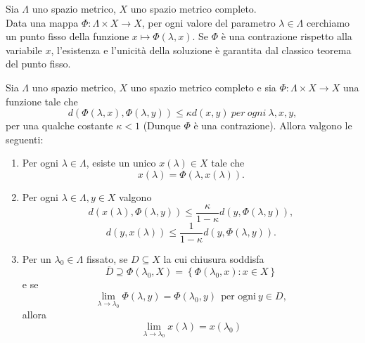 Sia $\Lambda$ uno spazio metrico, $X$ uno spazio metrico completo. \\ Data una mappa $\Phi : \Lambda \times X \rightarrow X$, per ogni valore del parametro $\lambda \in \Lambda$ cerchiamo un punto fisso della funzione $x \mapsto \Phi(\lambda, x)$. Se $\Phi$ è una contrazione rispetto alla variabile $x$, l'esistenza e l'unicità della soluzione è garantita dal classico teorema del punto fisso.
\begin{teorema}
Sia $\Lambda$ uno spazio metrico, $X$ uno spazio metrico completo e sia $\Phi : \Lambda \times X \rightarrow X$ una funzione tale che
\begin{equation}\label{1.1}
d(\Phi(\lambda,x), \Phi(\lambda,y)) \leq \kappa d(x, y) \ per \ ogni \ \lambda, x, y,
\end{equation}
per una qualche costante $\kappa < 1$ (Dunque $\Phi$ è una contrazione). Allora valgono le seguenti:
\begin{enumerate}
    \item Per ogni $\lambda \in \Lambda$, esiste un unico $x(\lambda) \in X$ tale che
        \begin{equation}\label{1.2}
            x(\lambda)=\Phi(\lambda,x(\lambda)).
        \end{equation}
    \item Per ogni $\lambda \in \Lambda, y \in X$ valgono
        \begin{equation}\label{1.3}
            d(x(\lambda), \Phi(\lambda,y))\leq\frac{\kappa}{1-\kappa}d(y,\Phi(\lambda,y)),
        \end{equation}
        \begin{equation}\label{1.4}
            d(y, x(\lambda))\leq\frac{1}{1-\kappa}d(y, \Phi(\lambda,y)).
        \end{equation}
    \item Per un $\lambda_{0} \in \Lambda$ fissato, se $D \subseteq X$ la cui chiusura soddisfa
        \begin{equation}\label{1.5}
            \overline{D} \supseteq \Phi(\lambda_{0},X)=\left\{\Phi(\lambda_{0},x)\colon x\in X\right\}
        \end{equation}
    e se
        \begin{equation}\label{1.6}
            \lim_{\lambda \rightarrow \lambda_{0}}\Phi(\lambda,y)=\Phi(\lambda_{0},y) \ \ \text{per ogni} \ y \in D,
        \end{equation}
    allora
        \begin{equation}\label{1.7}
            \lim_{\lambda\rightarrow\lambda_{0}}x(\lambda)=x(\lambda_{0})
        \end{equation}
\end{enumerate}
\end{teorema}
